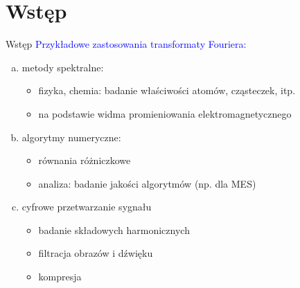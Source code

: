 \section{Wstęp}
\begin{frame}{Wstęp}
	\textcolor{blue}{Przykładowe zastosowania transformaty Fouriera:}
	
	\begin{enumerate}[a)]
		\item metody spektralne:
		\begin{itemize}
		    \item fizyka, chemia: badanie właściwości atomów, cząsteczek, itp.
			\item na podstawie widma promieniowania elektromagnetycznego
		\end{itemize}
        \item algorytmy numeryczne:
        \begin{itemize}
        	\item równania różniczkowe
        	\item analiza: badanie jakości algorytmów (np. dla MES)
        \end{itemize}
        \item cyfrowe przetwarzanie sygnału
        \begin{itemize}
        	\item badanie składowych harmonicznych
        	\item filtracja obrazów i dźwięku
        	\item kompresja
		\end{itemize}        	
	\end{enumerate}
\end{frame}
